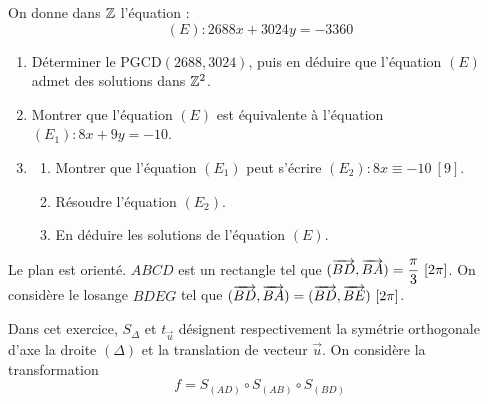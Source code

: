 \documentclass[11pt]{article}
\begin{document}


On donne dans $\mathbb{Z}$ l'équation :
\[ (E) : 2688x + 3024y = -3360 \]

\begin{enumerate}
  \item Déterminer le PGCD$(2688, 3024)$, puis en déduire que l'équation $(E)$ admet des solutions dans $\mathbb{Z}^2$.
  \item Montrer que l'équation $(E)$ est équivalente à l'équation $(E_1) : 8x + 9y = -10$.
  \item \begin{enumerate}[label=\alph*]
    \item Montrer que l'équation $(E_1)$ peut s'écrire $(E_2) : 8x \equiv -10\ [9]$.
    \item Résoudre l'équation $(E_2)$.
    \item En déduire les solutions de l'équation $(E)$.
  \end{enumerate}
\end{enumerate}


Le plan est orienté. $ABCD$ est un rectangle tel que $(\overrightarrow{BD},\overrightarrow{BA}) = \dfrac{\pi}{3}\ [2\pi]$. On considère le losange $BDEG$ tel que $(\overrightarrow{BD},\overrightarrow{BA}) = (\overrightarrow{BD},\overrightarrow{BE})\ [2\pi]$.

Dans cet exercice, $S_\Delta$ et $t_{\vec{u}}$ désignent respectivement la symétrie orthogonale d'axe la droite $(\Delta)$ et la translation de vecteur $\vec{u}$. On considère la transformation
\[ f = S_{(AD)} \circ S_{(AB)} \circ S_{(BD)} \]
\end{document}
